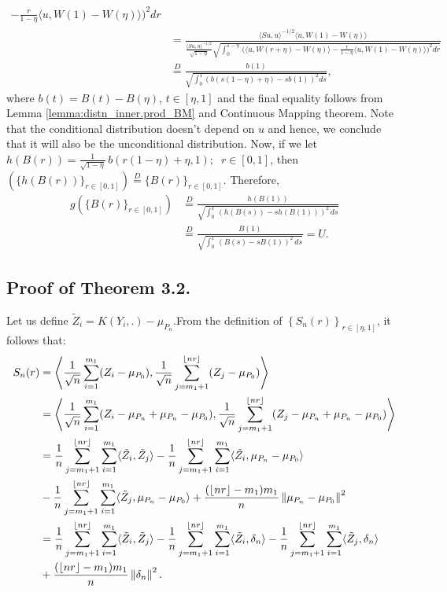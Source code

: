 \documentclass[11pt]{article}
\theoremstyle{plain}
\theoremstyle{definition}
\theoremstyle{remark}
\begin{document}
\begin{appendix}
\begin{align*}
{{  -\frac{r}{1-\eta} \langle u, W(1)-W(\eta)\rangle\Big)^2 dr}}\\
  &=\frac{\langle Su, u \rangle^{-1/2} \langle u, W(1)-W(\eta)\rangle}{\frac{\langle Su, u \rangle^{-1/2}}{\sqrt{1-\eta}}\sqrt{\int_{0}^{1-\eta}\,\Big(\langle u, W(r+\eta)-W(\eta)\rangle
  -\frac{r}{1-\eta} \langle u, W(1)-W(\eta)\rangle\Big)^2 dr}}\\
  &\overset{D}{=}\frac{b(1)}{\sqrt{\int_{0}^{1} \left(b(s(1-\eta)+\eta)-sb(1)\right)^2ds}},
\end{align*}
where $b(t)=B(t)-B(\eta)$, $t \in [\eta,1]$ and the final equality follows from Lemma \ref{lemma:distn_inner.prod_BM} and Continuous Mapping theorem.  Note that the conditional distribution doesn't depend on $u$ and hence, we conclude that it will also be the unconditional distribution. Now, if we let $h\left(B(r)\right)=\frac{1}{\sqrt{1-\eta}}\, b(r(1-\eta)+\eta,1);\;\; r \in [0,1]$, then $\left(\{h(B(r))\}_{r \in [0,1]}\right)\overset{D}{=}\{B(r)\}_{r \in [0,1]}.$ Therefore,
\begin{align*}
g\left(\{B(r)\}_{r \in [0,1]}\right) &\overset{D}{=}
   \frac{h(B(1))}{\sqrt{\int_{0}^{1}\, \left(h(B(s))-sh(B(1))\right)^2\, ds}}\\
   &\overset{D}{=}\frac{B(1)}{\sqrt{\int_{0}^{1}\, \left(B(s)-sB(1)\right)^2\, ds}}=U.
\end{align*}
\subsection{Proof of Theorem 3.2.}
 Let us define $\tilde{Z}_i=K(Y_i,.)-\mu_{P_n}$.From the definition of $\left\{S_n(r)\right\}_{r \in [\eta,1]}$, it follows that:
     \begin{align*}
        S_n(r)
        &=\left\langle \frac{1}{\sqrt{n}}\sum_{i=1}^{m_1}(Z_i-\mu_{P_0}),  \frac{1}{\sqrt{n}}\sum_{j=m_1+1}^{\lfloor nr \rfloor}(Z_j-\mu_{P_0})\right\rangle\\
        &=\left\langle \frac{1}{\sqrt{n}}\sum_{i=1}^{m_1}(Z_i-\mu_{P_n}+\mu_{P_n}-\mu_{P_0}),  \frac{1}{\sqrt{n}}\sum_{j=m_1+1}^{\lfloor nr \rfloor}(Z_j-\mu_{P_n}+\mu_{P_n}-\mu_{P_0})\right\rangle\\
        &=\frac{1}{n}\sum_{j=m_1+1}^{\lfloor nr \rfloor}\sum_{i=1}^{m_1} \langle \tilde{Z}_i,\tilde{Z}_j\rangle-\frac{1}{n}\sum_{j=m_1+1}^{\lfloor nr \rfloor}\sum_{i=1}^{m_1}\langle \tilde{Z}_i, \mu_{P_n}-\mu_{P_0}\rangle\\
        &-\frac{1}{n}\sum_{j=m_1+1}^{\lfloor nr \rfloor}\sum_{i=1}^{m_1}\langle \tilde{Z}_j, \mu_{P_n}-\mu_{P_0}\rangle +\frac{(\lfloor nr \rfloor-m_1) m_1}{n}\left\|\mu_{P_n}-\mu_{P_0}\right\|^2\allowdisplaybreaks\\
        &=\frac{1}{n}\sum_{j=m_1+1}^{\lfloor nr \rfloor}\sum_{i=1}^{m_1} \langle \tilde{Z}_i,\tilde{Z}_j\rangle-\frac{1}{n}\sum_{j=m_1+1}^{\lfloor nr \rfloor}\sum_{i=1}^{m_1}\langle \tilde{Z}_i,\delta_n\rangle-\frac{1}{n}\sum_{j=m_1+1}^{\lfloor nr \rfloor}\sum_{i=1}^{m_1}\langle \tilde{Z}_j, \delta_n\rangle\\
        &+\frac{(\lfloor nr \rfloor-m_1) m_1}{n}\left\|\delta_n\right\|^2.
    \end{align*}
    

\end{appendix}
\end{document}
